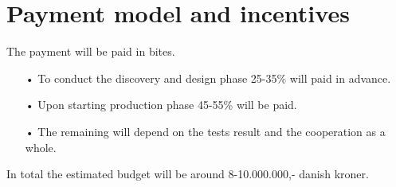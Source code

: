 \section{Payment model and incentives}
The payment will be paid in bites. 
\begin{enumerate}
\item[•] To conduct the discovery and design phase 25-35\% will paid in advance. 
\item[•] Upon starting production phase 45-55\% will be paid. 
\item[•] The remaining will depend on the tests result and the cooperation as a whole.
\end{enumerate}

In total the estimated budget will be around 8-10.000.000,- danish kroner. 